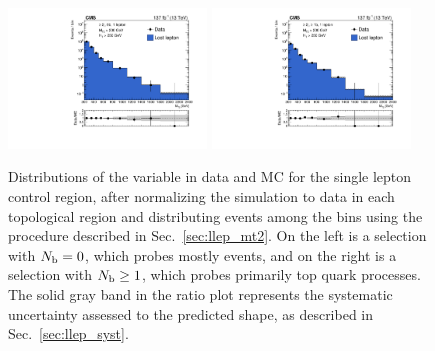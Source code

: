 \begin{figure}[t]
  \begin{center}
    \includegraphics[width=0.47\textwidth]{figs/llep/lostlepHybrid_0b_mt2bins.pdf}
    \includegraphics[width=0.47\textwidth]{figs/llep/lostlepHybrid_ge1b_mt2bins.pdf}
    \caption{Distributions of the \mttwo variable in data and MC for the single lepton control region,
      after normalizing the simulation to data in each topological region and distributing events
      among the \mttwo bins using the procedure described in Sec.~\ref{sec:llep_mt2}. On the left is a selection
      with $N_{\mathrm{b}}=0$, which probes mostly \wjets events, and on the right is a selection with $N_{\mathrm{b}}\geq1$, which
      probes primarily top quark processes. The solid gray band  in the ratio plot represents the
      systematic uncertainty assessed to the predicted \mttwo shape, as described in Sec.~\ref{sec:llep_syst}.
            }
    \label{fig:llep_mt2dist}
  \end{center}
\end{figure}


